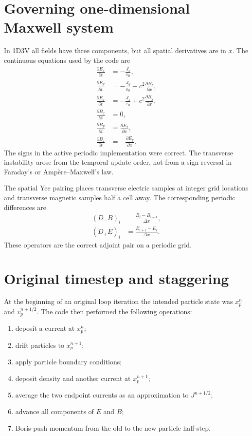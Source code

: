 \documentclass[11pt,a4paper]{article}
\newcommand{\epsz}{\varepsilon_0}
\begin{document}
\section{Governing one-dimensional Maxwell system}

In 1D3V all fields have three components, but all spatial derivatives are in
$x$.  The continuous equations used by the code are
\begin{align}
  \frac{\partial E_x}{\partial t} &= -\frac{J_x}{\epsz}, \\
  \frac{\partial E_y}{\partial t} &= -\frac{J_y}{\epsz}
      -c^2\frac{\partial B_z}{\partial x}, \\
  \frac{\partial E_z}{\partial t} &= -\frac{J_z}{\epsz}
      +c^2\frac{\partial B_y}{\partial x}, \\
  \frac{\partial B_x}{\partial t} &= 0, \\
  \frac{\partial B_y}{\partial t} &= \frac{\partial E_z}{\partial x}, \\
  \frac{\partial B_z}{\partial t} &= -\frac{\partial E_y}{\partial x}.
\end{align}
The signs in the active periodic implementation were correct.  The transverse
instability arose from the temporal update order, not from a sign reversal in
Faraday's or Amp\`ere--Maxwell's law.

The spatial Yee pairing places transverse electric samples at integer grid
locations and transverse magnetic samples half a cell away.  The corresponding
periodic differences are
\begin{align}
  (D_- B)_i &= \frac{B_i-B_{i-1}}{\Delta x}, \\
  (D_+ E)_i &= \frac{E_{i+1}-E_i}{\Delta x}.
\end{align}
These operators are the correct adjoint pair on a periodic grid.

\section{Original timestep and staggering}

At the beginning of an original loop iteration the intended particle state was
$x_p^n$ and $v_p^{n+1/2}$.  The code then performed the following operations:
\begin{enumerate}
  \item deposit a current at $x_p^n$;
  \item drift particles to $x_p^{n+1}$;
  \item apply particle boundary conditions;
  \item deposit density and another current at $x_p^{n+1}$;
  \item average the two endpoint currents as an approximation to
        $J^{n+1/2}$;
  \item advance all components of $E$ and $B$;
  \item Boris-push momentum from the old to the new particle half-step.
\end{enumerate}
\end{document}
